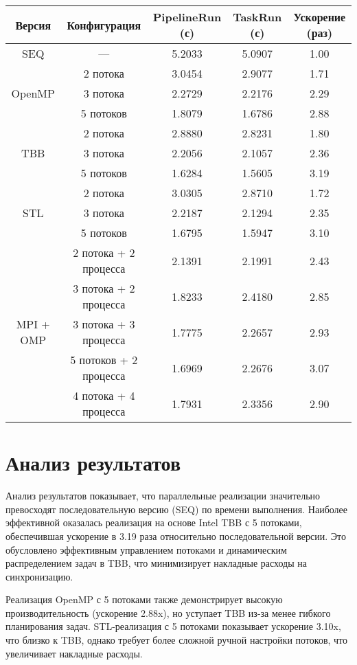 \documentclass[a4paper,12pt]{article}
\begin{document}
\begin{center}
\begin{tabular}{|c|c|c|c|c|}
\hline
\textbf{Версия} & \textbf{Конфигурация} & \textbf{PipelineRun (с)} & \textbf{TaskRun (с)} & \textbf{Ускорение (раз)} \\
\hline
SEQ & — & 5.2033 & 5.0907 & 1.00 \\
\hline
\multirow{3}{*}{OpenMP} 
 & 2 потока & 3.0454 & 2.9077 & 1.71 \\
 & 3 потока & 2.2729 & 2.2176 & 2.29 \\
 & 5 потоков & 1.8079 & 1.6786 & 2.88 \\
\hline
\multirow{3}{*}{TBB} 
 & 2 потока & 2.8880 & 2.8231 & 1.80 \\
 & 3 потока & 2.2056 & 2.1057 & 2.36 \\
 & 5 потоков & 1.6284 & 1.5605 & 3.19 \\
\hline
\multirow{3}{*}{STL} 
 & 2 потока & 3.0305 & 2.8710 & 1.72 \\
 & 3 потока & 2.2187 & 2.1294 & 2.35 \\
 & 5 потоков & 1.6795 & 1.5947 & 3.10 \\
\hline
\multirow{5}{*}{MPI + OMP} 
 & 2 потока + 2 процесса & 2.1391 & 2.1991 & 2.43 \\
 & 3 потока + 2 процесса & 1.8233 & 2.4180 & 2.85 \\
 & 3 потока + 3 процесса & 1.7775 & 2.2657 & 2.93 \\
 & 5 потоков + 2 процесса & 1.6969 & 2.2676 & 3.07 \\
 & 4 потока + 4 процесса & 1.7931 & 2.3356 & 2.90 \\
\hline
\end{tabular}
\end{center}

\section*{Анализ результатов}
Анализ результатов показывает, что параллельные реализации значительно превосходят последовательную версию (SEQ) по времени выполнения. Наиболее эффективной оказалась реализация на основе Intel TBB с 5 потоками, обеспечившая ускорение в 3.19 раза относительно последовательной версии. Это обусловлено эффективным управлением потоками и динамическим распределением задач в TBB, что минимизирует накладные расходы на синхронизацию.

Реализация OpenMP с 5 потоками также демонстрирует высокую производительность (ускорение 2.88x), но уступает TBB из-за менее гибкого планирования задач. STL-реализация с 5 потоками показывает ускорение 3.10x, что близко к TBB, однако требует более сложной ручной настройки потоков, что увеличивает накладные расходы.
\end{document}

